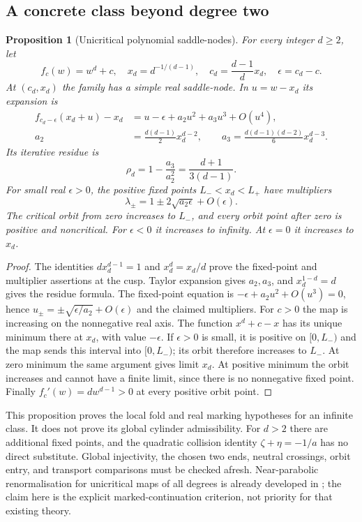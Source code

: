 \documentclass[11pt]{article}
\newtheorem{proposition}[theorem]{Proposition}
\begin{document}
\subsection{A concrete class beyond degree two}
\begin{proposition}[Unicritical polynomial saddle-nodes]
\label{prop:unicritical-fold}
For every integer $d\ge2$, let
\[
 f_c(w)=w^d+c,\quad x_d=d^{-1/(d-1)},\quad
 c_d=\frac{d-1}{d}x_d,\quad \epsilon=c_d-c.
\]
At $(c_d,x_d)$ the family has a simple real saddle-node. In $u=w-x_d$
its expansion is
\[
\begin{aligned}
 f_{c_d-\epsilon}(x_d+u)-x_d
 &=u-\epsilon+a_2u^2+a_3u^3+O(u^4),\\
 a_2&=\frac{d(d-1)}2x_d^{d-2},\qquad
 a_3=\frac{d(d-1)(d-2)}6x_d^{d-3}.
\end{aligned}
\]
Its iterative residue is
\[
 \rho_d=1-\frac{a_3}{a_2^2}=\frac{d+1}{3(d-1)}.
\]
For small real $\epsilon>0$, the positive fixed points $L_-<x_d<L_+$
have multipliers
\[
 \lambda_\pm=1\pm2\sqrt{a_2\epsilon}+O(\epsilon).
\]
The critical orbit from zero increases to $L_-$, and every orbit point
after zero is positive and noncritical. For $\epsilon<0$ it increases
to infinity. At $\epsilon=0$ it increases to $x_d$.
\end{proposition}
\begin{proof}
The identities $dx_d^{d-1}=1$ and $x_d^d=x_d/d$ prove the fixed-point
and multiplier assertions at the cusp. Taylor expansion gives $a_2,a_3$,
and $x_d^{1-d}=d$ gives the residue formula. The fixed-point equation
is $-\epsilon+a_2u^2+O(u^3)=0$, hence
$u_\pm=\pm\sqrt{\epsilon/a_2}+O(\epsilon)$ and the claimed multipliers.
For $c>0$ the map is increasing on the nonnegative real axis.
The function $x^d+c-x$ has its unique minimum there at $x_d$,
with value $-\epsilon$. If $\epsilon>0$ is small, it is positive on
$[0,L_-)$ and the map sends this interval into $[0,L_-)$; its orbit
therefore increases to $L_-$. At zero minimum the same argument gives
limit $x_d$. At positive minimum the orbit increases and cannot have
a finite limit, since there is no nonnegative fixed point.
Finally $f_c'(w)=dw^{d-1}>0$ at every positive orbit point.
\end{proof}
This proposition proves the local fold and real marking hypotheses
for an infinite class. It does not prove its global cylinder
admissibility. For $d>2$ there are additional fixed points, and the
quadratic collision identity $\zeta+\eta=-1/a$ has no direct substitute.
Global injectivity, the chosen two ends, neutral crossings, orbit entry,
and transport comparisons must be checked afresh. Near-parabolic
renormalisation for unicritical maps of all degrees is already developed
in \cite{Cheritat}; the claim here is the explicit marked-continuation
criterion, not priority for that existing theory.
\end{document}
